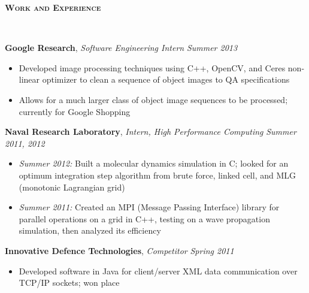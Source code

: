 \documentclass{article}
\newenvironment{changemargin}[2]{%
  \begin{list}{}{%
    \setlength{\topsep}{0pt}%
    \setlength{\leftmargin}{#1}%
    \setlength{\rightmargin}{#2}%
    \setlength{\listparindent}{\parindent}%
    \setlength{\itemindent}{\parindent}%
    \setlength{\parsep}{\parskip}%
  }%
  \item[]}{\end{list}
}
\newcommand{\lineover}{
	\begin{changemargin}{-0.05in}{-0.05in}
		\vspace*{-8pt}
		\hrulefill \\
		\vspace*{-2pt}
	\end{changemargin}
}
\newcommand{\header}[1]{
	\begin{changemargin}{-0.5in}{-0.5in}
		{\large \textbf{\scshape{#1}}}\\
  	\lineover
	\end{changemargin}
}
\newenvironment{body} {
	\vspace*{-16pt}
	\begin{changemargin}{-0.25in}{-0.5in}
  }	
	{\end{changemargin}
}
\begin{document}
\smallskip


\header{Work and Experience}

\begin{body}
	\vspace{14pt}
	\textbf{Google Research}, \emph{Software Engineering Intern} \hfill \emph{Summer 2013}\\
	\vspace*{-4pt}
	\begin{itemize}
		\item Developed image processing techniques using C++, OpenCV, and Ceres non-linear optimizer to clean a sequence of object images to QA specifications
		\item Allows for a much larger class of object image sequences to be processed; currently for Google Shopping
	\end{itemize}

	\medskip

	\textbf{Naval Research Laboratory}, \emph{Intern, High Performance Computing} \hfill \emph{Summer 2011, 2012}\\
	\vspace*{-4pt}
	\begin{itemize}
		\item \emph{Summer 2012:} Built a molecular dynamics simulation in C; looked for an optimum integration step algorithm from brute force, linked cell, and MLG (monotonic Lagrangian grid)
		\item \emph{Summer 2011:} Created an MPI (Message Passing Interface) library for parallel operations on a grid in C++, testing on a wave propagation simulation, then analyzed its efficiency
	\end{itemize}

	\medskip
	
	\textbf{Innovative Defence Technologies}, \emph{Competitor} \hfill \emph{Spring 2011}\\
	\vspace*{-4pt}
	\begin{itemize}
		\item Developed software in Java for client/server XML data communication over TCP/IP sockets; won  place
	\end{itemize}
	
	\medskip
	

\end{body}
\end{document}
